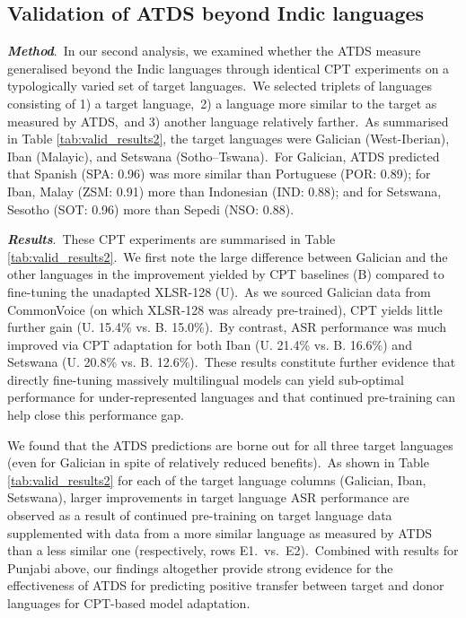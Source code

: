 \documentclass[main.tex]{subfiles}
\begin{document}

\subsection{Validation of ATDS beyond Indic languages}

\textbf{\textit{Method}}.~In our second analysis, we examined whether the ATDS measure generalised beyond the Indic languages through identical CPT experiments on a typologically varied set of target languages.~We selected triplets of languages consisting of 1) a target language,~2) a language more similar to the target as measured by ATDS,~and 3) another language relatively farther.~As summarised in Table \ref{tab:valid_results2}, the target languages were Galician (West-Iberian), Iban (Malayic), and Setswana (Sotho–Tswana).~For Galician, ATDS predicted that Spanish (S{\footnotesize{}PA}: 0.96) was more similar than Portuguese (P{\footnotesize{}OR}: 0.89); for Iban, Malay (Z{\footnotesize{}SM}: 0.91) more than Indonesian (I{\footnotesize{}ND}: 0.88); and for Setswana, Sesotho (S{\footnotesize{}OT}: 0.96) more than Sepedi (N{\footnotesize{}SO}: 0.88).

\noindent{}\textbf{\textit{Results}}.~These CPT experiments are summarised in Table \ref{tab:valid_results2}.~We first note the large difference between Galician and the other languages in the improvement yielded by CPT baselines (B) compared to fine-tuning the unadapted XLSR-128 (U).~As we sourced Galician data from CommonVoice (on which XLSR-128 was already pre-trained), CPT yields little further gain (U. 15.4\% vs. B. 15.0\%).~By contrast, ASR performance was much improved via CPT adaptation for both Iban (U. 21.4\% vs. B. 16.6\%) and Setswana (U. 20.8\% vs. B. 12.6\%).~These results constitute further evidence that directly fine-tuning massively multilingual models can yield sub-optimal performance for under-represented languages and that continued pre-training can help close this performance gap.

We found that the ATDS predictions are borne out for all three target languages (even for Galician in spite of relatively reduced benefits).~As shown in Table \ref{tab:valid_results2} for each of the target language columns (Galician, Iban, Setswana), larger improvements in target language ASR performance are observed as a result of continued pre-training on target language data supplemented with data from a more similar language as measured by ATDS than a less similar one (respectively, rows E1.~vs.~E2).~Combined with results for Punjabi above, our findings altogether provide strong evidence for the effectiveness of ATDS for predicting positive transfer between target and donor languages for CPT-based model adaptation.
\end{document}
